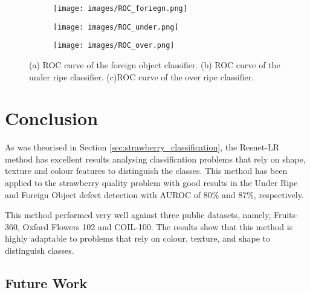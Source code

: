\documentclass[conference]{IEEEtran}
\begin{document}
\begin{figure}[ht]
	\centering
	\begin{subfigure}{0.9\linewidth}
	    \centering
		\texttt{[image: images/ROC\_foriegn.png]}
		\caption{}
		\label{fig:ROC_f}
	\end{subfigure}%
	
	\centering
	\begin{subfigure}{0.9\linewidth}
	    \centering
		\texttt{[image: images/ROC\_under.png]}
		\caption{}
		\label{fig:ROC_u}
	\end{subfigure}%
	
	\begin{subfigure}{0.9\linewidth}
	    \centering
		\texttt{[image: images/ROC\_over.png]}
		\caption{}
		\label{fig:ROC_o}
	\end{subfigure}%
	
	\caption{(a) ROC curve of the foreign object classifier. (b) ROC curve of the under ripe classifier. (c)ROC curve of the over ripe classifier.}
	\label{fig:ROCs}
\end{figure}










\section{Conclusion}

As was theorised in Section \ref{sec:strawberry_classification}, the Resnet-LR method has excellent results analysing classification problems that rely on shape, texture and colour features to distinguish the classes. This method has been applied to the strawberry quality problem with good results in the Under Ripe and Foreign Object defect detection with AUROC of 80\% and 87\%, respectively. 

This method performed very well against three public datasets, namely, Fruits-360, Oxford Flowers 102 and COIL-100. The results show that this method is highly adaptable to problems that rely on colour, texture, and shape to distinguish classes.

\subsection{Future Work}
\end{document}
